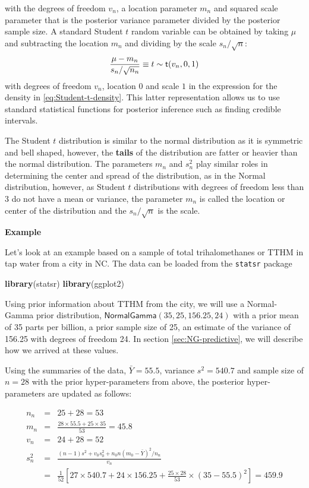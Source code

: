 \documentclass[]{book}
\newenvironment{Shaded}{\begin{snugshade}}{\end{snugshade}}
\newcommand{\KeywordTok}[1]{\textcolor[rgb]{0.13,0.29,0.53}{\textbf{{#1}}}}
\newcommand{\NormalTok}[1]{{#1}}
\theoremstyle{definition}
\theoremstyle{definition}
\theoremstyle{definition}
\theoremstyle{remark}
\begin{document}
with the degrees of freedom \(v_n\), a location parameter \(m_n\) and
squared scale parameter that is the posterior variance parameter divided
by the posterior sample size. A standard Student \(t\) random variable
can be obtained by taking \(\mu\) and subtracting the location \(m_n\)
and dividing by the scale \(s_n/\sqrt{n}\):
\[ \frac{\mu - m_n}{s_n/\sqrt{n_n}} \equiv t \sim \textsf{t}(v_n, 0 , 1)  \]
with degrees of freedom \(v_n\), location \(0\) and scale \(1\) in the
expression for the density in \eqref{eq:Student-t-density}. This latter
representation allows us to use standard statistical functions for
posterior inference such as finding credible intervals.

The Student \(t\) distribution is similar to the normal distribution as
it is symmetric and bell shaped, however, the \textbf{tails} of the
distribution are fatter or heavier than the normal distribution. The
parameters \(m_n\) and \(s^2_n\) play similar roles in determining the
center and spread of the distribution, as in the Normal distribution,
however, as Student \(t\) distributions with degrees of freedom less
than 3 do not have a mean or variance, the parameter \(m_n\) is called
the location or center of the distribution and the \(s_n/\sqrt{n}\) is
the scale.

\textbf{Example}

Let's look at an example based on a sample of total trihalomethanes or
TTHM in tap water from a city in NC. The data can be loaded from the
\texttt{statsr} package

\begin{Shaded}
\begin{Highlighting}[]
\KeywordTok{library}\NormalTok{(statsr)}
\KeywordTok{library}\NormalTok{(ggplot2)}
\end{Highlighting}
\end{Shaded}

Using prior information about TTHM from the city, we will use a
Normal-Gamma prior distribution,
\(\textsf{NormalGamma}(35, 25, 156.25, 24)\) with a prior mean of 35
parts per billion, a prior sample size of 25, an estimate of the
variance of 156.25 with degrees of freedom 24. In section
\ref{sec:NG-predictive}, we will describe how we arrived at these
values.

Using the summaries of the data, \(\bar{Y} = 55.5\), variance
\(s^2 = 540.7\) and sample size of \(n = 28\) with the prior
hyper-parameters from above, the posterior hyper-parameters are updated
as follows:

\begin{eqnarray*}
n_n & = &  25 +  28 = 53\\
m_n  & = & \frac{28 \times55.5 + 25 \times35}{53} = 45.8  \\
v_n & = & 24 + 28 = 52  \\
s^2_n & = & \frac{(n-1) s^2 + v_0 s^2_0 + n_0 n (m_0 - \bar{Y})^2 /n_n }{v_n}  \\
  & = & \frac{1}{52}
     \left[27 \times 540.7 +
          24 \times 156.25  +
          \frac{25 \times 28}{53} \times (35 - 55.5)^2
\right] = 459.9  \\
\end{eqnarray*}
\end{document}
